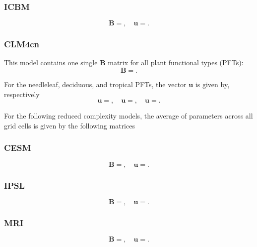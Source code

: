 \documentclass[draft,linenumbers]{agujournal}
\begin{document}
\subsubsection*{ICBM}
\begin{equation}
\mathbf{B} =
,
\quad {\bm u} =
.
\end{equation}

\subsubsection*{CLM4cn}
This model contains one single $\mathbf{B}$ matrix for all plant functional types (PFTs):
\begin{equation}
\mathbf{B} =
.
\end{equation}

For the needleleaf, deciduous, and tropical PFTs, the vector ${\bm u}$ is given by, respectively
\begin{equation}
{\bm u} =
, 
\quad {\bm u}=
, 
\quad {\bm u}=
.
\end{equation}

For the following reduced complexity models, the average of parameters across all grid cells is given by the following matrices

\subsubsection*{CESM}
\begin{equation}
\mathbf{B} =
,
\quad {\bm u} =
.
\end{equation}

\subsubsection*{IPSL}
\begin{equation}
\mathbf{B} =
,
\quad {\bm u} =
.
\end{equation}

\subsubsection*{MRI}
\begin{equation}
\mathbf{B} =
,
\quad {\bm u} =
.
\end{equation}
\end{document}
